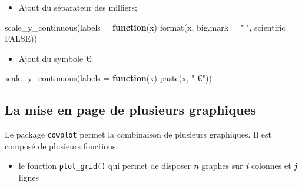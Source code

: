 \documentclass[
]{book}
\newenvironment{Shaded}{\begin{snugshade}}{\end{snugshade}}
\newcommand{\AttributeTok}[1]{\textcolor[rgb]{0.77,0.63,0.00}{#1}}
\newcommand{\ConstantTok}[1]{\textcolor[rgb]{0.00,0.00,0.00}{#1}}
\newcommand{\ControlFlowTok}[1]{\textcolor[rgb]{0.13,0.29,0.53}{\textbf{#1}}}
\newcommand{\FunctionTok}[1]{\textcolor[rgb]{0.00,0.00,0.00}{#1}}
\newcommand{\NormalTok}[1]{#1}
\newcommand{\StringTok}[1]{\textcolor[rgb]{0.31,0.60,0.02}{#1}}
\providecommand{\tightlist}{%
  \setlength{\itemsep}{0pt}\setlength{\parskip}{0pt}}
\begin{document}
\begin{itemize}
\tightlist
\item
  Ajout du séparateur des milliers;
\end{itemize}

\begin{Shaded}
\begin{Highlighting}[]
\FunctionTok{scale\_y\_continuous}\NormalTok{(}\AttributeTok{labels =} \ControlFlowTok{function}\NormalTok{(x) }\FunctionTok{format}\NormalTok{(x, }\AttributeTok{big.mark =} \StringTok{" "}\NormalTok{, }\AttributeTok{scientific =} \ConstantTok{FALSE}\NormalTok{))}
\end{Highlighting}
\end{Shaded}

\begin{itemize}
\tightlist
\item
  Ajout du symbole €;
\end{itemize}

\begin{Shaded}
\begin{Highlighting}[]
\FunctionTok{scale\_y\_continuous}\NormalTok{(}\AttributeTok{labels =} \ControlFlowTok{function}\NormalTok{(x) }\FunctionTok{paste}\NormalTok{(x, }\StringTok{" €"}\NormalTok{))}
\end{Highlighting}
\end{Shaded}

\hypertarget{la-mise-en-page-de-plusieurs-graphiques}{%
\subsection{La mise en page de plusieurs graphiques}\label{la-mise-en-page-de-plusieurs-graphiques}}

Le package \texttt{cowplot} permet la combinaison de plusieurs graphiques. Il est composé de plusieurs fonctions.

\begin{itemize}
\tightlist
\item
  le fonction \texttt{plot\_grid()} qui permet de disposer \textbf{\emph{n}} graphes sur \textbf{\emph{i}} colonnes et \textbf{\emph{j}} lignes
\end{itemize}
\end{document}
